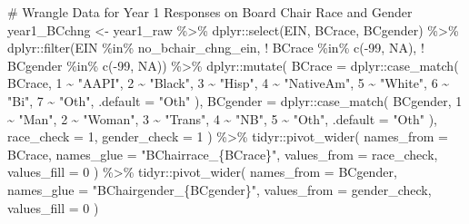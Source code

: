 \documentclass[
  letterpaper,
]{scrbook}
\newenvironment{Shaded}{\begin{snugshade}}{\end{snugshade}}
\newcommand{\AttributeTok}[1]{\textcolor[rgb]{0.40,0.45,0.13}{#1}}
\newcommand{\CommentTok}[1]{\textcolor[rgb]{0.37,0.37,0.37}{#1}}
\newcommand{\ConstantTok}[1]{\textcolor[rgb]{0.56,0.35,0.01}{#1}}
\newcommand{\DecValTok}[1]{\textcolor[rgb]{0.68,0.00,0.00}{#1}}
\newcommand{\FunctionTok}[1]{\textcolor[rgb]{0.28,0.35,0.67}{#1}}
\newcommand{\NormalTok}[1]{\textcolor[rgb]{0.00,0.23,0.31}{#1}}
\newcommand{\OtherTok}[1]{\textcolor[rgb]{0.00,0.23,0.31}{#1}}
\newcommand{\SpecialCharTok}[1]{\textcolor[rgb]{0.37,0.37,0.37}{#1}}
\newcommand{\StringTok}[1]{\textcolor[rgb]{0.13,0.47,0.30}{#1}}
\begin{document}
\begin{Shaded}
\begin{Highlighting}[]
\CommentTok{\# Wrangle Data for Year 1 Responses on Board Chair Race and Gender}
\NormalTok{year1\_BCchng }\OtherTok{\textless{}{-}}\NormalTok{ year1\_raw }\SpecialCharTok{\%\textgreater{}\%} 
\NormalTok{  dplyr}\SpecialCharTok{::}\FunctionTok{select}\NormalTok{(EIN, BCrace, BCgender) }\SpecialCharTok{\%\textgreater{}\%} 
\NormalTok{  dplyr}\SpecialCharTok{::}\FunctionTok{filter}\NormalTok{(EIN }\SpecialCharTok{\%in\%}\NormalTok{ no\_bchair\_chng\_ein,}
                \SpecialCharTok{!}\NormalTok{ BCrace }\SpecialCharTok{\%in\%} \FunctionTok{c}\NormalTok{(}\SpecialCharTok{{-}}\DecValTok{99}\NormalTok{, }\ConstantTok{NA}\NormalTok{),}
                \SpecialCharTok{!}\NormalTok{ BCgender }\SpecialCharTok{\%in\%} \FunctionTok{c}\NormalTok{(}\SpecialCharTok{{-}}\DecValTok{99}\NormalTok{, }\ConstantTok{NA}\NormalTok{)) }\SpecialCharTok{\%\textgreater{}\%} 
\NormalTok{  dplyr}\SpecialCharTok{::}\FunctionTok{mutate}\NormalTok{(}
    \AttributeTok{BCrace =}\NormalTok{ dplyr}\SpecialCharTok{::}\FunctionTok{case\_match}\NormalTok{(}
\NormalTok{      BCrace,}
      \DecValTok{1} \SpecialCharTok{\textasciitilde{}} \StringTok{"AAPI"}\NormalTok{, }\DecValTok{2} \SpecialCharTok{\textasciitilde{}} \StringTok{"Black"}\NormalTok{, }\DecValTok{3} \SpecialCharTok{\textasciitilde{}} \StringTok{"Hisp"}\NormalTok{, }\DecValTok{4} \SpecialCharTok{\textasciitilde{}} \StringTok{"NativeAm"}\NormalTok{, }\DecValTok{5} \SpecialCharTok{\textasciitilde{}} \StringTok{"White"}\NormalTok{, }\DecValTok{6} \SpecialCharTok{\textasciitilde{}} \StringTok{"Bi"}\NormalTok{, }\DecValTok{7} \SpecialCharTok{\textasciitilde{}} \StringTok{"Oth"}\NormalTok{,}
      \AttributeTok{.default =} \StringTok{"Oth"}
\NormalTok{    ),}
    \AttributeTok{BCgender =}\NormalTok{ dplyr}\SpecialCharTok{::}\FunctionTok{case\_match}\NormalTok{(}
\NormalTok{      BCgender,}
      \DecValTok{1} \SpecialCharTok{\textasciitilde{}} \StringTok{"Man"}\NormalTok{, }\DecValTok{2} \SpecialCharTok{\textasciitilde{}} \StringTok{"Woman"}\NormalTok{, }\DecValTok{3} \SpecialCharTok{\textasciitilde{}} \StringTok{"Trans"}\NormalTok{, }\DecValTok{4} \SpecialCharTok{\textasciitilde{}} \StringTok{"NB"}\NormalTok{, }\DecValTok{5} \SpecialCharTok{\textasciitilde{}} \StringTok{"Oth"}\NormalTok{,}
      \AttributeTok{.default =} \StringTok{"Oth"}
\NormalTok{    ),}
  \AttributeTok{race\_check =} \DecValTok{1}\NormalTok{,}
  \AttributeTok{gender\_check =} \DecValTok{1}
\NormalTok{  ) }\SpecialCharTok{\%\textgreater{}\%} 
\NormalTok{  tidyr}\SpecialCharTok{::}\FunctionTok{pivot\_wider}\NormalTok{(}
    \AttributeTok{names\_from =}\NormalTok{ BCrace,}
    \AttributeTok{names\_glue =} \StringTok{"BChairrace\_\{BCrace\}"}\NormalTok{,}
    \AttributeTok{values\_from =}\NormalTok{ race\_check, }
    \AttributeTok{values\_fill =} \DecValTok{0}
\NormalTok{  ) }\SpecialCharTok{\%\textgreater{}\%} 
\NormalTok{  tidyr}\SpecialCharTok{::}\FunctionTok{pivot\_wider}\NormalTok{(}
    \AttributeTok{names\_from =}\NormalTok{ BCgender,}
    \AttributeTok{names\_glue =} \StringTok{"BChairgender\_\{BCgender\}"}\NormalTok{,}
    \AttributeTok{values\_from =}\NormalTok{ gender\_check, }
    \AttributeTok{values\_fill =} \DecValTok{0}
\NormalTok{  )}
\end{Highlighting}
\end{Shaded}
\end{document}
